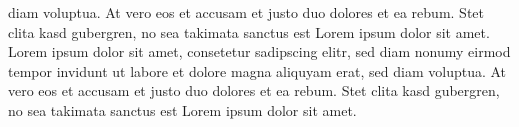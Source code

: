 diam voluptua. At vero eos et accusam et justo duo dolores et ea rebum. Stet clita kasd gubergren, no sea takimata sanctus est Lorem ipsum dolor sit amet. Lorem ipsum dolor sit amet, consetetur sadipscing elitr, sed diam nonumy eirmod tempor invidunt ut labore et dolore magna aliquyam erat, sed diam voluptua. At vero eos et accusam et justo duo dolores et ea rebum. Stet clita kasd gubergren, no sea takimata sanctus est Lorem ipsum dolor sit amet.